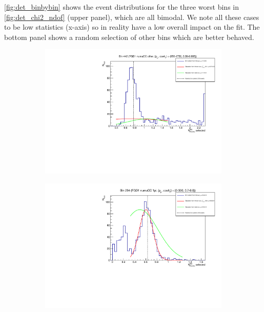 \autoref{fig:det_binbybin} shows the event distributions for the three worst bins in \autoref{fig:det_chi2_ndof} (upper panel), which are all bimodal. We note all these cases to be low statistics (x-axis) so in reality have a low overall impact on the fit. The bottom panel shows a random selection of other bins which are better behaved.
\begin{figure}[h]
	\begin{subfigure}[t]{0.32\textwidth}
		\includegraphics[width=\textwidth,page=1, trim={0mm 0mm 0mm 0mm}, clip]{figures/det/fdg1_numu_ccoth_bad}
	\end{subfigure}
	\begin{subfigure}[t]{0.32\textwidth}
		\includegraphics[width=\textwidth,page=1, trim={0mm 0mm 0mm 0mm}, clip]{figures/det/fgd1_numu_1pi_bad}
	\end{subfigure}

\end{figure}

